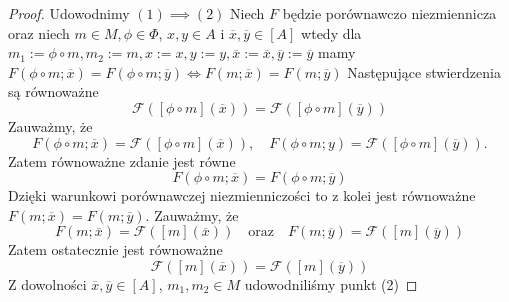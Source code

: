\documentclass[12pt,a4paper]{report}
\newcommand{\domkniecie}[1]{\left\lbrack{#1}\right\rbrack}
\begin{document}
\begin{proof}
Udowodnimy $(1) \implies (2)$
Niech $F$ będzie porównawczo niezmiennicza oraz niech $m\in M, \phi \in \Phi$, $x, y \in A$ i $\overline{x}, \overline{y} \in \domkniecie{A}$ wtedy dla $m_1:=\phi\circ m, m_2:=m, x:=x, y:=y, \overline{x}:=\overline{x}, \overline{y}:=\overline{y}$ mamy $F(\phi\circ m;\overline{x})=F(\phi\circ m;\overline{y}) \iff F(m;\overline{x})=F(m;\overline{y})$
Następujące stwierdzenia są równoważne
$$
\mathcal{F}(\domkniecie{\phi \circ m}(\overline{x}))=\mathcal{F}(\domkniecie{\phi \circ m}(\overline{y}))
$$
Zauważmy, że
$$
F(\phi \circ m;\overline{x})=\mathcal{F}( \domkniecie{\phi \circ m}(\overline{x})), \quad F(\phi \circ m;y)=\mathcal{F}(\domkniecie{\phi\circ m}(\overline{y})).
$$
Zatem równoważne zdanie jest równe 
$$
F(\phi\circ m;\overline{x})=F(\phi \circ m;\overline{y})
$$
Dzięki warunkowi porównawczej niezmienniczości to z kolei jest równoważne
$F(m;\overline{x})=F(m;\overline{y})$.
Zauważmy, że 
$$
F(m;\overline{x})=\mathcal{F}(\domkniecie{m}(\overline{x})) \quad \textrm{oraz} \quad F(m;\overline{y})=\mathcal{F}(\domkniecie{m}(\overline{y}))
$$
Zatem ostatecznie jest równoważne 
$$
\mathcal{F}(\domkniecie{m}(\overline{x}))=\mathcal{F}(\domkniecie{m}(\overline{y}))
$$
Z dowolności $\overline{x}, \overline{y} \in \domkniecie{A}$, $m_1, m_2 \in M$ udowodniliśmy punkt (2)


\end{proof}
\end{document}

